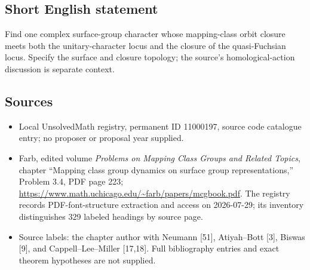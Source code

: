 \documentclass[11pt]{article}
\begin{document}
\subsection{Short English statement}
Find one complex surface-group character whose mapping-class orbit closure meets both the unitary-character locus and the closure of the quasi-Fuchsian locus. Specify the surface and closure topology; the source's homological-action discussion is separate context.
\subsection{Sources}
\begin{itemize}
\item Local UnsolvedMath registry, permanent ID 11000197, source code catalogue entry; no proposer or proposal year supplied.
\item Farb, edited volume \emph{Problems on Mapping Class Groups and Related Topics}, chapter ``Mapping class group dynamics on surface group representations,'' Problem 3.4, PDF page 223; \url{https://www.math.uchicago.edu/~farb/papers/mcgbook.pdf}. The registry records PDF-font-structure extraction and access on 2026-07-29; its inventory distinguishes 329 labeled headings by source page.
\item Source labels: the chapter author with Neumann [51], Atiyah--Bott [3], Biswas [9], and Cappell--Lee--Miller [17,18]. Full bibliography entries and exact theorem hypotheses are not supplied.
\end{itemize}
\end{document}
